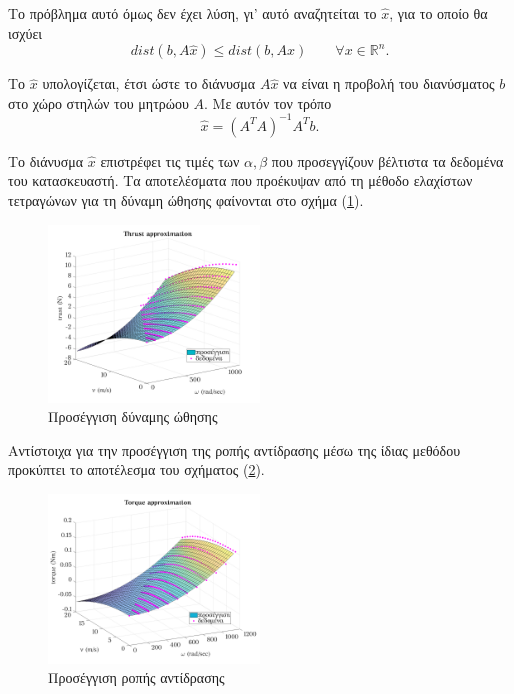 Το πρόβλημα αυτό όμως δεν έχει λύση, γι' αυτό αναζητείται το \(\widehat{x}\), 
για το οποίο θα ισχύει 
\begin{equation*}
    dist(b,A\widehat{x}) \le dist(b, Ax) \qquad \forall x\in \mathbb{R}^n.
\end{equation*}

Το \(\widehat{x}\) υπολογίζεται, έτσι ώστε το διάνυσμα \(A \widehat{x}\) να 
είναι η προβολή του διανύσματος \(b\) στο χώρο στηλών του μητρώου \(A\). Με 
αυτόν τον τρόπο 
\begin{equation*}
    \widehat{x} = (A^TA)^{-1} A^T b.
\end{equation*}

Το διάνυσμα \(\widehat{x}\) επιστρέφει τις τιμές των \(\alpha, \beta\) που
προσεγγίζουν βέλτιστα τα δεδομένα του κατασκευαστή. Τα αποτελέσματα που 
προέκυψαν από τη μέθοδο ελαχίστων τετραγώνων για τη δύναμη ώθησης φαίνονται στο 
σχήμα (\ref{th_app}).
\begin{figure}[H]
    \centering
    \includegraphics[width=0.5\textwidth]{Propeller/ThrustApproximation.png}
    \caption{Προσέγγιση δύναμης ώθησης}\label{th_app}
\end{figure}
Αντίστοιχα για την προσέγγιση της ροπής αντίδρασης μέσω της ίδιας μεθόδου 
προκύπτει το αποτέλεσμα του σχήματος (\ref{tq_app}).
\begin{figure}[H]
    \centering
    \includegraphics[width=0.5\textwidth]{Propeller/TorqueApproximation.png}
    \caption{Προσέγγιση ροπής αντίδρασης}\label{tq_app}
\end{figure}

